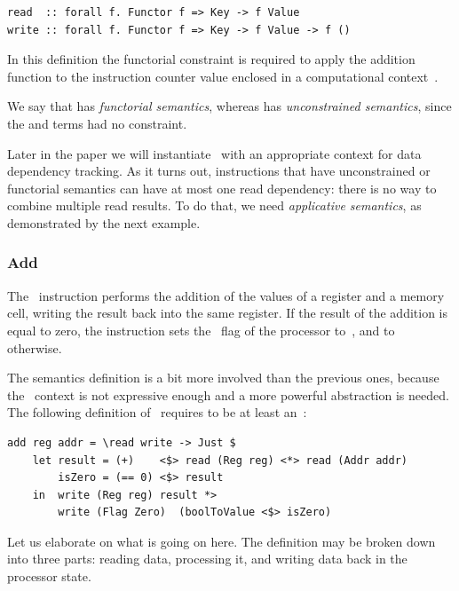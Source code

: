 \begin{verbatim}
read  :: forall f. Functor f => Key -> f Value
write :: forall f. Functor f => Key -> f Value -> f ()
\end{verbatim}

In this definition the functorial constraint is required to apply the addition
function  to the instruction counter value
enclosed in a computational context~.

We say that  has \emph{functorial semantics}, whereas  has
\emph{unconstrained semantics}, since the  and  terms had
no constraint.

Later in the paper we will instantiate~ with an appropriate context for
data dependency tracking. As it turns out, instructions that have unconstrained
or functorial semantics can have at most one read dependency: there is no way
to combine multiple read results. To do that, we need \emph{applicative
semantics}, as demonstrated by the next example.

\subsubsection{Add}

The~ instruction performs the addition of the values of a register and
a memory cell, writing the result back into the same register. If the result of
the addition is equal to zero, the instruction sets the~ flag of the
processor to~, and to~ otherwise.

The semantics definition is a bit more involved than the previous ones, because
the~ context is not expressive enough and a more powerful
abstraction is needed. The following definition of~ requires
 to be at least an~:

\begin{verbatim}
add reg addr = \read write -> Just $
    let result = (+)    <$> read (Reg reg) <*> read (Addr addr)
        isZero = (== 0) <$> result
    in  write (Reg reg) result *>
        write (Flag Zero)  (boolToValue <$> isZero)
\end{verbatim}

\noindent
Let us elaborate on what is going on here. The definition may be broken down
into three parts: reading data, processing it, and writing data back in the
processor state.

